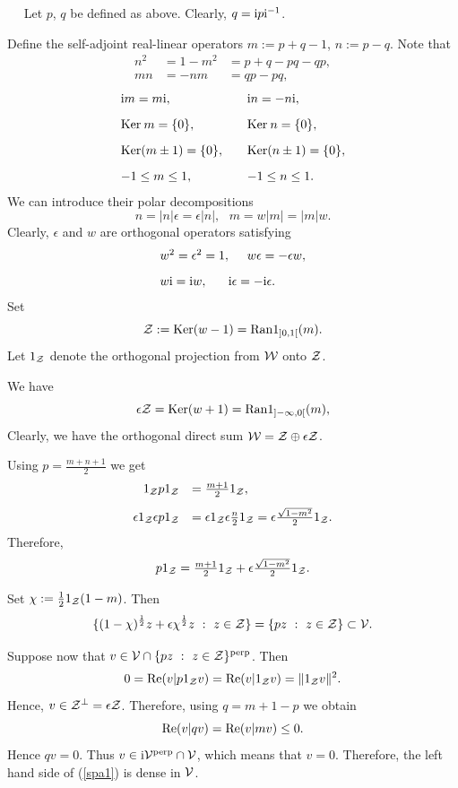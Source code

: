 \documentclass{svmult}
\newcommand{\beq}{\begin{equation}}
\newcommand{\eeq}{\end{equation}}
\def\Re{{\rm Re}}
\def\perpr{{\rm perp}}
\def\proof{
\noindent{\bf Proof.}\ \ }
\def\cZ{{\cal Z}}
\def\cV{{\cal V}}
\def\cW{{\cal W}}
\def\i{{\rm i}}
\def\Ker{{\rm Ker}}
\def\Ran{{\rm Ran}}
\def\Ker{{\rm Ker}}
\def\Ran{{\rm Ran}}
\begin{document}
\proof
 Let $p$, $q$ be defined as above. Clearly, $q=\i
p\i^{-1}$.

Define the self-adjoint real-linear operators
 $m:=p+q-1$, $n:=p-q$. Note that
\[\begin{array}{rll}
  n^2&=1-m^2&=p+q-pq-qp,\\[3mm] mn&=-nm&=qp-pq,
\end{array}\]
\[\begin{array}{ll}
\i m=m\i,\ \ &\i n=-n\i,\\[3mm]
\Ker\: m=\{0\},\ \ \ &\Ker\: n=\{0\},\\[3mm]
\Ker(m\pm1)=\{0\},\ \ \ &\Ker(n\pm1)=\{0\},\\[3mm]
-1\leq m\leq1,\ \ \ &-1\leq n\leq1.
\end{array}
\]
We can introduce their polar decompositions
\[n=|n|\epsilon=\epsilon|n|,\ \ \ m=w|m|=|m|w.\]Clearly,
 $\epsilon$ and $w$ are orthogonal operators satisfying
\[\begin{array}{l}
w^2=\epsilon^2=1,\ \ \ \ 
w\epsilon=-\epsilon w,\\[3mm]
 w\i=\i w,\ \ \ \ \ \i\epsilon=-\i\epsilon.
\end{array}
\]
Set \[\cZ:=\Ker(w-1)=\Ran 1_{]0,1[}(m).\]
Let $1_\cZ$ denote the orthogonal projection from $\cW$ onto
$\cZ$.

We have \[\epsilon\cZ=\Ker(w+1)=\Ran 1_{]-\infty,0[}(m),\]
Clearly, we have the orthogonal direct sum $\cW=\cZ\oplus\epsilon\cZ$.


Using $p=\frac{m+n+1}{2}$ 
we get
\[\begin{array}{rl}
1_\cZ p1_\cZ&=\frac{m+1}{2}1_\cZ,\\[3mm]
\epsilon1_{\cZ }\epsilon p1_{\cZ}&=\epsilon 1_{\cZ}\epsilon
\frac{n}{2}1_{\cZ}
=\epsilon 
\frac{\sqrt{1-m^2}}{2}1_{\cZ}.\end{array}\]
Therefore,\[\begin{array}{l}
p1_\cZ=\frac{m+1}{2}1_\cZ+\epsilon 
\frac{\sqrt{1-m^2}}{2}1_{\cZ}.\end{array}\]

Set 
$\chi:=\frac121_\cZ(1- m)$.
Then
\beq \{(1-\chi)^\frac12z+\epsilon\chi^\frac12 z\ : \
z\in\cZ\}=\{pz\ :\ z\in\cZ\}\subset \cV.\label{spa1}\eeq



Suppose now that $v\in\cV\cap\{pz\ :\ z\in\cZ\}^\perpr$.
Then
\[0=\Re(v|p1_\cZ v)=\Re(v|1_\cZ v)=\|1_\cZ v\|^2.\]
Hence, $v\in\cZ^\perp=\epsilon\cZ$. 
Therefore, using $q=m+1-p$ we obtain
\[\Re(v|qv)=\Re(v|m v)\leq0.\]
Hence $qv=0$. Thus $v\in\i\cV^\perpr\cap\cV$, which means that
$v=0$. Therefore, the left hand side of
(\ref{spa1}) is dense in $\cV$.
\end{document}
